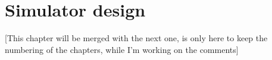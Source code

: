 \chapter{Simulator design}

[This chapter will be merged with the next one, is only here to keep the
numbering of the chapters, while I'm working on the comments]
